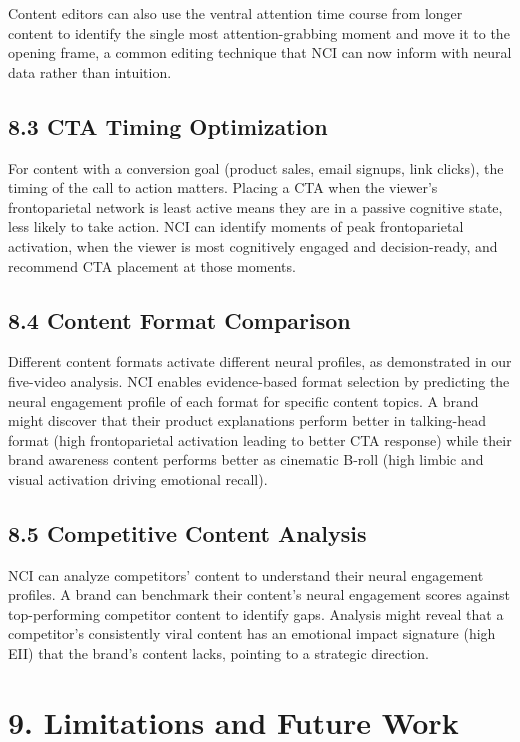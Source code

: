\documentclass[11pt,letterpaper]{article}
\begin{document}
Content editors can also use the ventral attention time course from longer content to identify the single most attention-grabbing moment and move it to the opening frame, a common editing technique that NCI can now inform with neural data rather than intuition.

\subsection{8.3 CTA Timing Optimization}

For content with a conversion goal (product sales, email signups, link clicks), the timing of the call to action matters. Placing a CTA when the viewer's frontoparietal network is least active means they are in a passive cognitive state, less likely to take action. NCI can identify moments of peak frontoparietal activation, when the viewer is most cognitively engaged and decision-ready, and recommend CTA placement at those moments.

\subsection{8.4 Content Format Comparison}

Different content formats activate different neural profiles, as demonstrated in our five-video analysis. NCI enables evidence-based format selection by predicting the neural engagement profile of each format for specific content topics. A brand might discover that their product explanations perform better in talking-head format (high frontoparietal activation leading to better CTA response) while their brand awareness content performs better as cinematic B-roll (high limbic and visual activation driving emotional recall).

\subsection{8.5 Competitive Content Analysis}

NCI can analyze competitors' content to understand their neural engagement profiles. A brand can benchmark their content's neural engagement scores against top-performing competitor content to identify gaps. Analysis might reveal that a competitor's consistently viral content has an emotional impact signature (high EII) that the brand's content lacks, pointing to a strategic direction.


\section{9. Limitations and Future Work}
\end{document}
